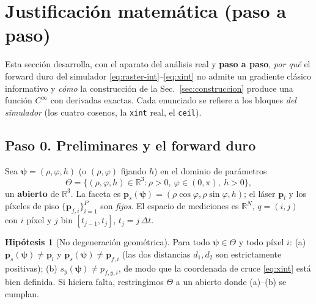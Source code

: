 \documentclass[11pt,a4paper]{article}
\theoremstyle{plain}
\theoremstyle{definition}
\newtheorem{assumption}{Hip\'otesis}
\newcommand{\vect}[1]{\boldsymbol{#1}}
\newcommand{\R}{\mathbb{R}}
\begin{document}
\section{Justificaci\'on matem\'atica (paso a paso)}
\label{sec:justificacion}

Esta secci\'on desarrolla, con el aparato del an\'alisis real y \textbf{paso a
paso}, \emph{por qu\'e} el forward duro del simulador
\eqref{eq:raster-int}--\eqref{eq:xint} no admite un gradiente cl\'asico
informativo y \emph{c\'omo} la construcci\'on de la Sec.~\ref{sec:construccion}
produce una funci\'on $C^\infty$ con derivadas exactas. Cada enunciado se refiere a
los bloques \emph{del simulador} (los cuatro cosenos, la \texttt{xint} real, el
\texttt{ceil}).

\subsection*{Paso 0. Preliminares y el forward duro}
\label{sec:prelim}

Sea $\vect{\psi}=(\rho,\varphi,h)$ (o $(\rho,\varphi)$ fijando $h$) en el dominio
de par\'ametros
\begin{equation}
    \Theta=\bigl\{(\rho,\varphi,h)\in\R^3 : \rho>0,\ \varphi\in(0,\pi),\ h>0\bigr\},
    \label{eq:Theta}
\end{equation}
un \textbf{abierto} de $\R^3$. La faceta es
$\vect{p}_s(\vect{\psi})=(\rho\cos\varphi,\rho\sin\varphi,h)$; el l\'aser
$\vect{p}_l$ y los p\'ixeles de piso $\{\vect{p}_{f,i}\}_{i=1}^{P}$ son
\emph{fijos}. El espacio de mediciones es $\R^N$, $q=(i,j)$ con $i$ p\'ixel y $j$
bin $[t_{j-1},t_j]$, $t_j=j\,\Delta t$.

\begin{assumption}[No degeneraci\'on geom\'etrica]\label{as:geom}
Para todo $\vect{\psi}\in\Theta$ y todo p\'ixel $i$:
(a) $\vect{p}_s(\vect{\psi})\neq\vect{p}_l$ y
$\vect{p}_s(\vect{\psi})\neq\vect{p}_{f,i}$ (las dos distancias $d_1,d_2$ son
estrictamente positivas);
(b) $s_y(\vect{\psi})\neq p_{f,y,i}$, de modo que la coordenada de cruce
\eqref{eq:xint} est\'a bien definida. Si hiciera falta, restringimos $\Theta$ a
un abierto donde (a)--(b) se cumplan.
\end{assumption}
\end{document}
